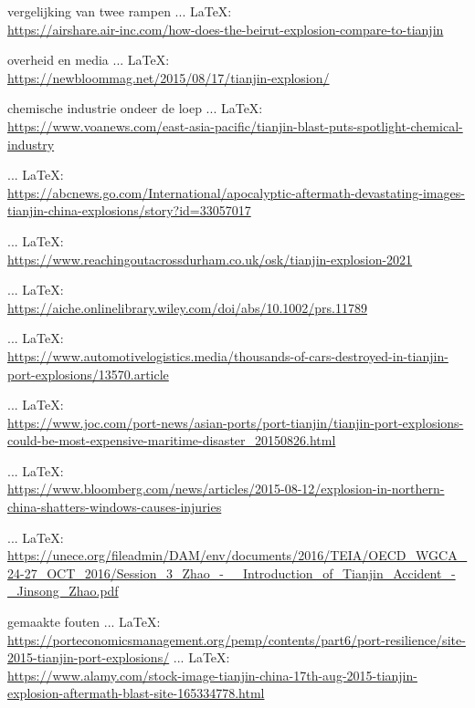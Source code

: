 \begin{thebibliography}{99}
{{{			vergelijking van twee rampen
			 ... \LaTeX:\\ \url{https://airshare.air-inc.com/how-does-the-beirut-explosion-compare-to-tianjin}
			
			overheid en media
			 ... \LaTeX:\\ \url{https://newbloommag.net/2015/08/17/tianjin-explosion/}
			
			chemische industrie ondeer de loep
			 ... \LaTeX:\\ \url{https://www.voanews.com/east-asia-pacific/tianjin-blast-puts-spotlight-chemical-industry}
			
			 ... \LaTeX:\\ \url{https://abcnews.go.com/International/apocalyptic-aftermath-devastating-images-tianjin-china-explosions/story?id=33057017}
			
			 ... \LaTeX:\\ \url{https://www.reachingoutacrossdurham.co.uk/osk/tianjin-explosion-2021}
			
			 ... \LaTeX:\\ \url{https://aiche.onlinelibrary.wiley.com/doi/abs/10.1002/prs.11789}
			
			 ... \LaTeX:\\ \url{https://www.automotivelogistics.media/thousands-of-cars-destroyed-in-tianjin-port-explosions/13570.article}
			
			 ... \LaTeX:\\ \url{https://www.joc.com/port-news/asian-ports/port-tianjin/tianjin-port-explosions-could-be-most-expensive-maritime-disaster_20150826.html}
			
			 ... \LaTeX:\\ \url{https://www.bloomberg.com/news/articles/2015-08-12/explosion-in-northern-china-shatters-windows-causes-injuries}
			
			 ... \LaTeX:\\ \url{https://unece.org/fileadmin/DAM/env/documents/2016/TEIA/OECD_WGCA_24-27_OCT_2016/Session_3_Zhao_-__Introduction_of_Tianjin_Accident_-_Jinsong_Zhao.pdf}
			
			gemaakte fouten
			 ... \LaTeX:\\ \url{https://porteconomicsmanagement.org/pemp/contents/part6/port-resilience/site-2015-tianjin-port-explosions/}
			 ... \LaTeX:\\ \url{https://www.alamy.com/stock-image-tianjin-china-17th-aug-2015-tianjin-explosion-aftermath-blast-site-165334778.html}
			
}}}
\end{thebibliography}
